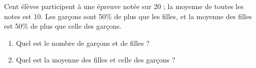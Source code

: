 \documentclass[12pt]{article}
\begin{document}
\begin{exercice}
\end{exercice}


\begin{exercice}
  Cent élèves participent à une épreuve notée sur 20 ; la moyenne de toutes les notes est 10.
  Les garçons sont 50\% de plus que les filles, et la moyenne des filles est 50\% de plus que celle des garçons.
  \begin{enumerate}[(1)]
    \item Quel est le nombre de garçons et de filles ?
    \item Quel est la moyenne des filles et celle des garçons ?
  \end{enumerate}
\end{exercice}
\end{document}
